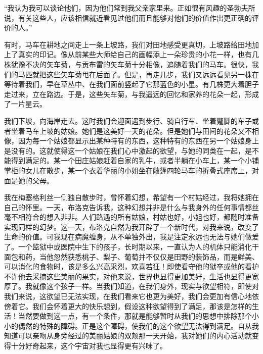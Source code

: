 \par “我认为我可以谈论他们，因为他们常到我父亲家里来。正如很有风趣的圣勃夫所说，有关这些人，应该相信就近看见过他们而且能够对他们的价值作出更正确的评价的人。”
\par 有时，马车在耕地之间走上一条上坡路，我们对田地感受更真切，上坡路给田地加上了真实的印记。像从前某些大师给自己的画幅添上一朵珍贵的小花一样，也有几株犹豫不决的矢车菊，与贡布雷的矢车菊十分相像，追随着我们的马车。很快，我们的马匹就把这些矢车菊甩在后面了。但是，再走几步，我们又远远看见另一株在等待着我们，早在草丛中、在我们面前竖起了它那蓝色的小星。有几株更大着胆子走过来，立在路边。于是，这些矢车菊，与我遥远的回忆和家养的花朵一起，形成了一片星云。
\par 我们下坡，向海岸走去。这时我们会迎面遇到步行、骑自行车、坐着蹩脚的车子或者坐着马车上坡的姑娘。她们是这美好一天的花朵。但是她们与田间的花朵又不相像，因为每一个姑娘都显示出某种特有的东西，这种特有的东西在另一个姑娘身上是没有的。这就使得这一个姑娘在我们心中激起的欲望，与她的同类在一起，是不能得到满足的。某一个田庄姑娘赶着自家的乳牛，或者半躺在小车上，某一个小铺掌柜的女儿在散步，某一个衣着华丽的小姐坐在敞篷四轮马车的折叠式座席上，对面是她的父母。
\par 我在梅塞格利丝一侧独自散步时，曾怀着幻想，希望有一个村姑经过，我将她拥在自己的怀里。一天，布洛克告诉我，这种幻想并非是什么与我身外的任何事情都丝毫不相符合的想入非非。人们路遇的所有姑娘，村姑也好，小姐也好，都随时准备实现同样的幻梦。这一天，布洛克自然为我开辟了一个新时代，对我来说，改变了生命的价值。可我现在病魔缠身，从不单独外出，我是注定永远也无法与她们做爱了。一个监狱中或医院中生下的孩子，长时期以来，一直认为人的机体只能消化干面包和药，当他忽然获悉桃子、梨子、葡萄并不仅仅是田野的装饰品，而是鲜美、可以消化的食物时，该是多么兴高采烈，欢喜若狂！即使看守他的狱卒或他的看护不许他去采摘这些美丽的果实，对他来说，世界也显得更加美好，生活也显得更宽厚了。我就像这个孩子一样。当我们知道，在我们身外，现实与欲望相符，即使对我们来说，这欲望已无法实现，在我们看来它也更为美好，我们会更加有信心地依傍着它。我们会怀着更大的快乐想到，假设这种欲望得到了满足，那该是怎样的生活！当然要做到这一点，有一个条件，那就是能够暂时从我们的思想中排除那个小小的偶然的特殊的障碍。正是这个障碍，使我们的这个欲望无法得到满足。自从我知道可以亲吻从身旁经过的美丽姑娘的双颊那一天开始，我对她们的内心活动就变得十分好奇起来，这个宇宙对我也显得更有兴味了。
